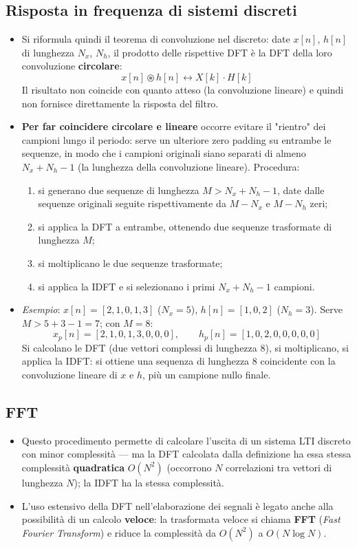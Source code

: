 \documentclass[12pt, a4paper]{article}
\begin{document}
\subsection{Risposta in frequenza di sistemi discreti}
\begin{itemize}
    \item Si riformula quindi il teorema di convoluzione nel discreto: date $x[n]$, $h[n]$ di lunghezza $N_x$, $N_h$, il prodotto delle rispettive DFT è la DFT della loro convoluzione \textbf{circolare}:
    $$x[n]\circledast h[n] \longleftrightarrow X[k]\cdot H[k]$$
    Il risultato non coincide con quanto atteso (la convoluzione lineare) e quindi non fornisce direttamente la risposta del filtro.
    \item \textbf{Per far coincidere circolare e lineare} occorre evitare il "rientro" dei campioni lungo il periodo: serve un ulteriore zero padding su entrambe le sequenze, in modo che i campioni originali siano separati di almeno $N_x+N_h-1$ (la lunghezza della convoluzione lineare). Procedura:
    \begin{enumerate}
        \item si generano due sequenze di lunghezza $M>N_x+N_h-1$, date dalle sequenze originali seguite rispettivamente da $M-N_x$ e $M-N_h$ zeri;
        \item si applica la DFT a entrambe, ottenendo due sequenze trasformate di lunghezza $M$;
        \item si moltiplicano le due sequenze trasformate;
        \item si applica la IDFT e si selezionano i primi $N_x+N_h-1$ campioni.
    \end{enumerate}
    \item \textit{Esempio}: $x[n]=[2,1,0,1,3]$ ($N_x=5$), $h[n]=[1,0,2]$ ($N_h=3$). Serve $M>5+3-1=7$; con $M=8$:
    $$x_p[n]=[2,1,0,1,3,0,0,0], \qquad h_p[n]=[1,0,2,0,0,0,0,0]$$
    Si calcolano le DFT (due vettori complessi di lunghezza $8$), si moltiplicano, si applica la IDFT: si ottiene una sequenza di lunghezza $8$ coincidente con la convoluzione lineare di $x$ e $h$, più un campione nullo finale.
\end{itemize}

\subsection{FFT}
\begin{itemize}
    \item Questo procedimento permette di calcolare l'uscita di un sistema LTI discreto con minor complessità — ma la DFT calcolata dalla definizione ha essa stessa complessità \textbf{quadratica} $O(N^2)$ (occorrono $N$ correlazioni tra vettori di lunghezza $N$); la IDFT ha la stessa complessità.
    \item L'uso estensivo della DFT nell'elaborazione dei segnali è legato anche alla possibilità di un calcolo \textbf{veloce}: la trasformata veloce si chiama \textbf{FFT} (\textit{Fast Fourier Transform}) e riduce la complessità da $O(N^2)$ a $O(N\log N)$.
\end{itemize}
\end{document}
